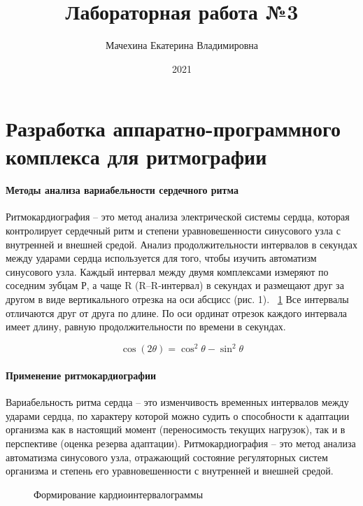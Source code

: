 \documentclass{article}
\title{Лабораторная работа №3}
\author{Мачехина Екатерина Владимировна}
\date{2021}
\begin{document}
	\maketitle
	\newpage
	\section{Разработка аппаратно-программного комплекса для ритмографии}
	\paragraph{Методы анализа вариабельности сердечного ритма}
	
	
	Ритмокардиография – это метод анализа электрической системы сердца, которая контролирует сердечный ритм и степени уравновешенности синусового узла с внутренней и внешней средой. Анализ продолжительности интервалов в секундах между ударами сердца используется для того, чтобы изучить автоматизм синусового узла. 
	Каждый интервал между двумя комплексами измеряют по соседним зубцам Р, а чаще R (R–R-интервал) в секундах и размещают друг за другом в виде вертикального отрезка на оси абсцисс (рис. 1). 
	~\ref{fig:picture-1}
	Все интервалы отличаются друг от друга по длине. По оси ординат отрезок каждого интервала имеет длину, равную продолжительности по времени в секундах. 
	
	
	\begin{equation}\label{eq:formula}
		\cos (2\theta) = \cos^2 \theta - \sin^2 \theta
	\end{equation}
	\newpage
	\paragraph{	Применение ритмокардиографии}

	Вариабельность ритма сердца – это изменчивость временных интервалов между ударами сердца, по характеру которой можно судить о способности к адаптации организма как в настоящий момент (переносимость текущих нагрузок), так и в перспективе (оценка резерва адаптации).
	Ритмокардиография – это метод анализа автоматизма синусового узла, отражающий состояние регуляторных систем организма и степень его уравновешенности с внутренней и внешней средой.
	
	
	\begin{figure}[h]
		\caption{Формирование кардиоинтервалограммы}
		\label{fig:picture-1}
	\end{figure}
	\newpage
	\tableofcontents
\end{document}
